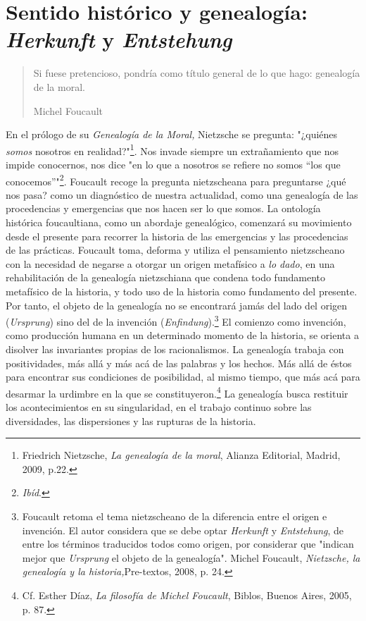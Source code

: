 \documentclass{book}
\begin{document}
\section{Sentido histórico y genealogía: \emph{Herkunft} y
  \emph{Entstehung}}

\begin{quote}
Si fuese pretencioso, pondría como título general de lo que hago:
genealogía de la moral.

Michel Foucault
\end{quote}

En el prólogo de su \emph{Genealogía de la Moral,} Nietzsche se
pregunta: "¿quiénes \emph{somos} nosotros en realidad?"\footnote{Friedrich
  Nietzsche, \emph{La genealogía de la moral}, Alianza Editorial,
  Madrid, 2009, p.22.}. Nos invade siempre un extrañamiento que nos
impide conocernos, nos dice "en lo que a nosotros se refiere no somos
``los que conocemos''"\footnote{\emph{Ibíd}.}. Foucault recoge la
pregunta nietzscheana para preguntarse ¿qué nos pasa? como un
diagnóstico de nuestra actualidad, como una genealogía de las
procedencias y emergencias que nos hacen ser lo que somos. La ontología
histórica foucaultiana, como un abordaje genealógico, comenzará su
movimiento desde el presente para recorrer la historia de las
emergencias y las procedencias de las prácticas. Foucault toma, deforma
y utiliza el pensamiento nietzscheano con la necesidad de negarse a
otorgar un origen metafísico a \emph{lo dado}, en una rehabilitación de
la genealogía nietzschiana que condena todo fundamento metafísico de la
historia, y todo uso de la historia como fundamento del presente. Por
tanto, el objeto de la genealogía no se encontrará jamás del lado del
origen (\emph{Ursprung}) sino del de la invención
(\emph{Enfindung}).\footnote{Foucault retoma el tema nietzscheano de la
  diferencia entre el origen e invención. El autor considera que se debe
  optar \emph{Herkunft} y \emph{Entstehung}, de entre los términos
  traducidos todos como origen, por considerar que "indican mejor que
  \emph{Ursprung} el objeto de la genealogía". Michel Foucault,
  \emph{Nietzsche, la genealogía y la historia,}Pre-textos, 2008, p. 24.}
El comienzo como invención, como producción humana en un determinado
momento de la historia, se orienta a disolver las invariantes propias de
los racionalismos. La genealogía trabaja con positividades, más allá y
más acá de las palabras y los hechos. Más allá de éstos para encontrar
sus condiciones de posibilidad, al mismo tiempo, que más acá para
desarmar la urdimbre en la que se constituyeron.\footnote{Cf. Esther
  Díaz, \emph{La filosofía de Michel Foucault}, Biblos, Buenos Aires,
  2005, p. 87.} La genealogía busca restituir los acontecimientos en su
singularidad, en el trabajo continuo sobre las diversidades, las
dispersiones y las rupturas de la historia.
\end{document}
